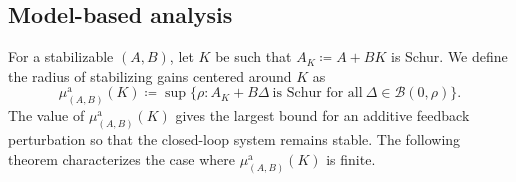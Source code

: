 \documentclass[9pt,shortpaper,twoside,web]{ieeecolor}
\begin{document}

\subsection{Model-based analysis}
\label{sub:frag_mod}

For a stabilizable $(A,B)$, let $K$ be such that $A_K\coloneqq A+BK$ is Schur. We define the radius of stabilizing gains centered around $K$ as
\begin{equation}
\label{eq:psiK}
\mu_{(A,B)}^{\text{a}}(K)\!\!\coloneqq\! \sup \{\rho\!:\!A_K+B\Delta\ \text{is Schur for all}\ \Delta\!\in\!\mathcal{B}(0,\rho)\}.
\end{equation}
The value of $\mu_{(A,B)}^{\text{a}}(K)$ gives the largest bound for an additive feedback perturbation so that the closed-loop system remains stable. The following theorem characterizes the case where $\mu_{(A,B)}^{\text{a}}(K)$ is finite. 
\end{document}
